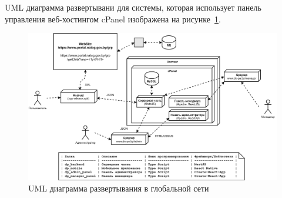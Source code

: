 UML диаграмма развертывани для системы,
которая использует панель управления веб-хостингом cPanel изображена на рисунке~\ref{fig:db_UML_deployment_prod}.

\begin{figure}[!h]
    \centering

    \includegraphics[width=17.5cm]
    {images/UML/deployment/production.png}

    \caption{UML диаграмма развертывания в глобальной сети}

    \label{fig:db_UML_deployment_prod}
\end{figure}
